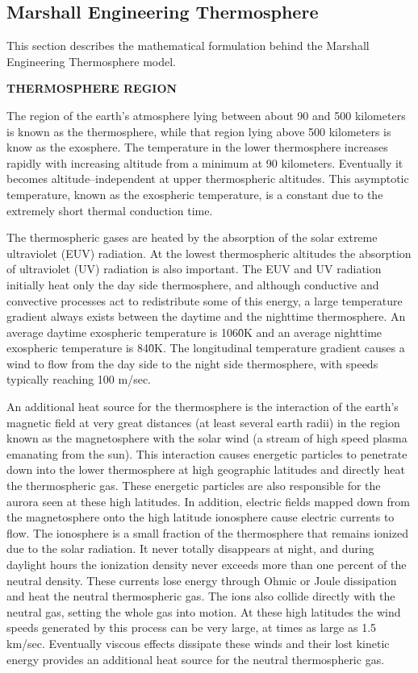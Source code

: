 \subsection{Marshall Engineering Thermosphere}

This section describes the mathematical formulation behind the Marshall Engineering
Thermosphere model.

\textbf{THERMOSPHERE REGION}

The region of the earth's atmosphere lying between about 90 and 500
kilometers is known as the thermosphere, while that region lying above 500
kilometers is know as the exosphere.  The temperature in the lower
thermosphere increases rapidly with increasing altitude from a minimum at 90
kilometers.  Eventually it becomes altitude--independent at upper
thermospheric altitudes.  This asymptotic temperature, known as the
exospheric temperature, is a constant due to the extremely short thermal
conduction time.

The thermospheric gases are heated by the absorption of the solar extreme
ultraviolet (EUV) radiation.  At the lowest thermospheric altitudes the
absorption of ultraviolet (UV) radiation is also important.  The EUV and UV
radiation initially heat only the day side thermosphere, and although
conductive and convective processes act to redistribute some of this energy,
a large temperature gradient always exists between the daytime and the
nighttime thermosphere.  An average daytime exospheric temperature is
1060\r{ }K and an average nighttime exospheric temperature is 840\r{ }K.  The
longitudinal temperature gradient causes a wind to flow from the day side to
the night side thermosphere, with speeds typically reaching 100 m/sec.

An additional heat source for the thermosphere is the interaction of the
earth's magnetic field at very great distances (at least several earth
radii) in the region known as the magnetosphere with the solar wind (a
stream of high speed plasma emanating from the sun).  This interaction causes
energetic particles to penetrate down into the lower thermosphere at high
geographic latitudes and directly heat the thermospheric gas.  These
energetic particles are also responsible for the aurora seen at these high
latitudes.  In addition, electric fields mapped down from the magnetosphere
onto the high latitude ionosphere cause electric currents to flow. The
ionosphere is a small fraction of the thermosphere that remains ionized due
to the solar radiation. It never totally disappears at night, and during
daylight hours the ionization density never exceeds more than one percent of
the neutral density. These currents lose energy through Ohmic or Joule
dissipation and heat the neutral thermospheric gas. The ions also collide
directly with the neutral gas, setting the whole gas into motion. At these
high latitudes the wind speeds generated by this process can be very large,
at times as large as 1.5 km/sec.  Eventually viscous effects dissipate these
winds and their lost kinetic energy provides an additional heat source for
the neutral thermospheric gas.

